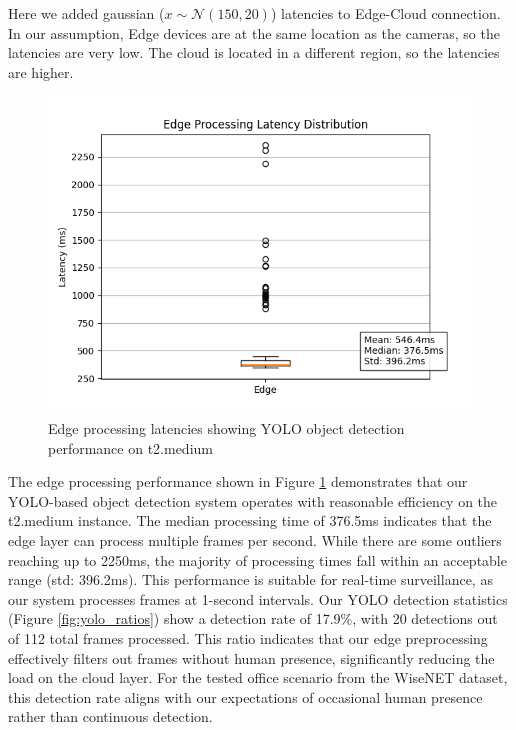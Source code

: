 \documentclass[conference]{IEEEtran}
\begin{document}
Here we added gaussian  ($x \sim \mathcal{N}(150, 20)$) latencies to Edge-Cloud connection. In our assumption, Edge devices are at the same location as the cameras, so the latencies are very low. The cloud is located in a different region, so the latencies are higher. 
\hfill \break
\hfill \break

\begin{figure}[h!]
    \centering
    \includegraphics[width=1\linewidth]{./res/evaluation_with_latencies/edge_latencies.png}
    \caption{Edge processing latencies showing YOLO object detection performance on t2.medium }
    \label{fig:edge_latencies}
\end{figure}

The edge processing performance shown in Figure \ref{fig:edge_latencies} demonstrates that our YOLO-based object detection system operates with reasonable efficiency on the t2.medium instance. The median processing time of 376.5ms indicates that the edge layer can process multiple frames per second. While there are some outliers reaching up to 2250ms, the majority of processing times fall within an acceptable range (std: 396.2ms). This performance is suitable for real-time surveillance, as our system processes frames at 1-second intervals.
Our YOLO detection statistics (Figure \ref{fig:yolo_ratios}) show a detection rate of 17.9\%, with 20 detections out of 112 total frames processed. This ratio indicates that our edge preprocessing effectively filters out frames without human presence, significantly reducing the load on the cloud layer. For the tested office scenario from the WiseNET dataset, this detection rate aligns with our expectations of occasional human presence rather than continuous detection.
\end{document}
